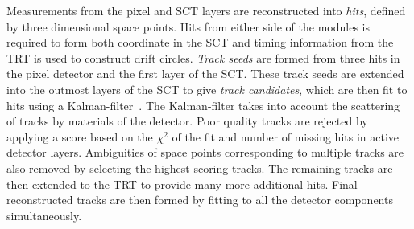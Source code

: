 Measurements from the pixel and SCT layers are reconstructed into \emph{hits}, defined by three dimensional space points. Hits from either side of the modules is required to form both coordinate in the SCT and timing information from the TRT is used to construct drift circles. \emph{Track seeds} are formed from three hits in the pixel detector and the first layer of the SCT. These track seeds are extended into the outmost layers of the SCT to give \emph{track candidates}, which are then fit to hits using a Kalman-filter~\cite{ATLAS:tracking,ATLAS:Kalman}. The Kalman-filter takes into account the scattering of tracks by materials of the detector. Poor quality tracks are rejected by applying a score based on the $\chi^2$ of the fit and number of missing hits in active detector layers. Ambiguities of space points corresponding to multiple tracks are also removed by selecting the highest scoring tracks. The remaining tracks are then extended to the TRT to provide many more additional hits. Final reconstructed tracks are then formed by fitting to all the detector components simultaneously. 

